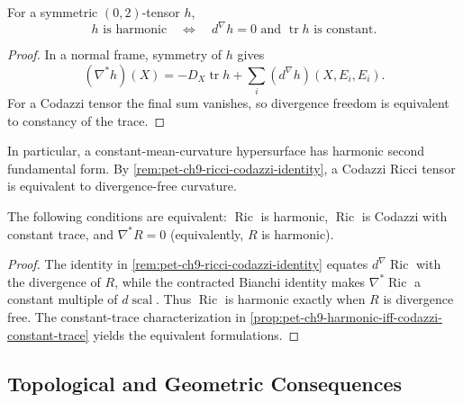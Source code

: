 \begin{proposition}
  \label{prop:pet-ch9-harmonic-iff-codazzi-constant-trace}

  For a symmetric $(0,2)$-tensor $h$,
  \[
    h\text{ is harmonic}\quad\Longleftrightarrow\quad
    d^\nabla h=0\text{ and }\operatorname{tr}h\text{ is constant}.
  \]
\end{proposition}
\begin{proof}
  \sketch
  In a normal frame, symmetry of \(h\) gives
  \[
    (\nabla^*h)(X)=-D_X\operatorname{tr}h
      +\sum_i(d^\nabla h)(X,E_i,E_i).
  \]
  For a Codazzi tensor the final sum vanishes, so divergence freedom is
  equivalent to constancy of the trace.
\end{proof}

In particular, a constant-mean-curvature hypersurface has harmonic second
fundamental form.  By \cref{rem:pet-ch9-ricci-codazzi-identity}, a Codazzi Ricci
tensor is equivalent to divergence-free curvature.

\begin{corollary}
  \label{cor:pet-ch9-ricci-harmonic-iff-curvature-harmonic}

  The following conditions are equivalent: $\operatorname{Ric}$ is harmonic,
  $\operatorname{Ric}$ is Codazzi with constant trace, and
  $\nabla^*R=0$ (equivalently, $R$ is harmonic).
\end{corollary}
\begin{proof}
  \sketch
  The identity in \cref{rem:pet-ch9-ricci-codazzi-identity} equates
  \(d^\nabla\operatorname{Ric}\) with the divergence of \(R\), while the
  contracted Bianchi identity makes \(\nabla^*\operatorname{Ric}\) a constant
  multiple of \(d\operatorname{scal}\).  Thus \(\operatorname{Ric}\) is
  harmonic exactly when \(R\) is divergence free.  The constant-trace
  characterization in \cref{prop:pet-ch9-harmonic-iff-codazzi-constant-trace}
  yields the equivalent formulations.
\end{proof}

\subsection{Topological and Geometric Consequences}

